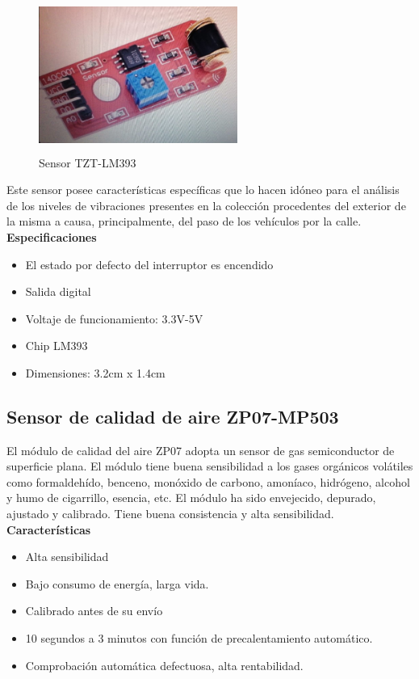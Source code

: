 \begin{figure}[H]
    \centering
    \includegraphics[width=6.5cm, height=5cm]{imagenes/sensor TZT.jpg}
    \caption{Sensor TZT-LM393}
    \label{imag:TZT}
\end{figure}

\newpage

Este sensor posee características específicas que lo hacen idóneo para el análisis de los niveles de vibraciones presentes en la colección procedentes del exterior de la misma a causa, principalmente, del paso de los vehículos por la calle.\\

\textbf{Especificaciones}
\begin{itemize}
    \item El estado por defecto del interruptor es encendido
    \item Salida digital
    \item Voltaje de funcionamiento: 3.3V-5V
    \item Chip LM393
    \item Dimensiones: 3.2cm x 1.4cm
\end{itemize}

\subsection{Sensor de calidad de aire ZP07-MP503}

El módulo de calidad del aire ZP07 adopta un sensor de gas semiconductor de superficie plana. El módulo tiene buena sensibilidad a los gases orgánicos volátiles como formaldehído, benceno, monóxido de carbono, amoníaco, hidrógeno, alcohol y humo de cigarrillo, esencia, etc. El módulo ha sido envejecido, depurado, ajustado y calibrado. Tiene buena consistencia y alta sensibilidad.\\

\textbf{Características}
\begin{itemize}
    \item Alta sensibilidad
    \item Bajo consumo de energía, larga vida.
    \item Calibrado antes de su envío
    \item 10 segundos a 3 minutos con función de precalentamiento automático.
    \item Comprobación automática defectuosa, alta rentabilidad.
\end{itemize}


